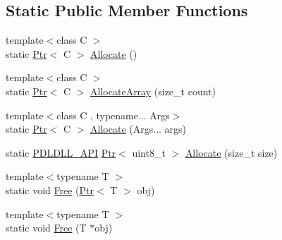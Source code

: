 \subsection*{Static Public Member Functions}
\begin{DoxyCompactItemize}
\item 
{\footnotesize template$<$class C $>$ }\\static \mbox{\hyperlink{classpdl_1_1memory_1_1_ptr}{Ptr}}$<$ C $>$ \mbox{\hyperlink{classpdl_1_1memory_1_1_memory_pool_ad9f48031e24244ce81a6bbd875b19691}{Allocate}} ()
\item 
{\footnotesize template$<$class C $>$ }\\static \mbox{\hyperlink{classpdl_1_1memory_1_1_ptr}{Ptr}}$<$ C $>$ \mbox{\hyperlink{classpdl_1_1memory_1_1_memory_pool_a357d1d1814f465ff10135bf5150261b7}{Allocate\+Array}} (size\+\_\+t count)
\item 
{\footnotesize template$<$class C , typename... Args$>$ }\\static \mbox{\hyperlink{classpdl_1_1memory_1_1_ptr}{Ptr}}$<$ C $>$ \mbox{\hyperlink{classpdl_1_1memory_1_1_memory_pool_a2d72e2ca74e788748927d0d0e4e4f9de}{Allocate}} (Args... args)
\item 
static \mbox{\hyperlink{_p_d_core_8h_ae8c5186e53170509c65eaabab6c2c705}{P\+D\+L\+D\+L\+L\+\_\+\+A\+PI}} \mbox{\hyperlink{classpdl_1_1memory_1_1_ptr}{Ptr}}$<$ uint8\+\_\+t $>$ \mbox{\hyperlink{classpdl_1_1memory_1_1_memory_pool_a1af8c603a813cf50fb53a0ef73c605c2}{Allocate}} (size\+\_\+t size)
\item 
{\footnotesize template$<$typename T $>$ }\\static void \mbox{\hyperlink{classpdl_1_1memory_1_1_memory_pool_a6878d25b15e64a6c49bf078c73643304}{Free}} (\mbox{\hyperlink{classpdl_1_1memory_1_1_ptr}{Ptr}}$<$ T $>$ obj)
\item 
{\footnotesize template$<$typename T $>$ }\\static void \mbox{\hyperlink{classpdl_1_1memory_1_1_memory_pool_a39fb7e967c001f078697b897df919851}{Free}} (T $\ast$obj)
\end{DoxyCompactItemize}
